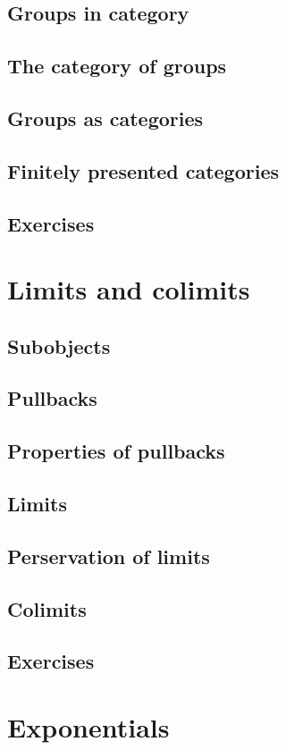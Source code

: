 \documentclass[uplatex, 12pt, dvipdfmx]{jsarticle}
\begin{document}
\subsection{Groups in category}
\subsection{The category of groups}
\subsection{Groups as categories}
\subsection{Finitely presented categories}
\subsection{Exercises}

\section{Limits and colimits}

\subsection{Subobjects}
\subsection{Pullbacks}
\subsection{Properties of pullbacks}
\subsection{Limits}
\subsection{Perservation of limits}
\subsection{Colimits}
\subsection{Exercises}

\section{Exponentials}
\end{document}
